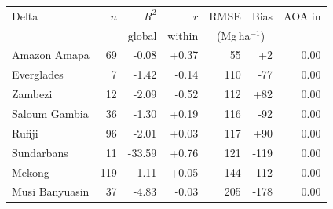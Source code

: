 \begin{tabular}{lrrrrrr}
\toprule
Delta & $n$ & $R^2$ & $r$ & RMSE & Bias & AOA in \\
 & & global & within & \multicolumn{2}{c}{(Mg\,ha$^{-1}$)} & \\
\midrule
Amazon Amapa & 69 & -0.08 & +0.37 & 55 & +2 & 0.00 \\
Everglades & 7 & -1.42 & -0.14 & 110 & -77 & 0.00 \\
Zambezi & 12 & -2.09 & -0.52 & 112 & +82 & 0.00 \\
Saloum Gambia & 36 & -1.30 & +0.19 & 116 & -92 & 0.00 \\
Rufiji & 96 & -2.01 & +0.03 & 117 & +90 & 0.00 \\
Sundarbans & 11 & -33.59 & +0.76 & 121 & -119 & 0.00 \\
Mekong & 119 & -1.11 & +0.05 & 144 & -112 & 0.00 \\
Musi Banyuasin & 37 & -4.83 & -0.03 & 205 & -178 & 0.00 \\
\bottomrule
\end{tabular}

